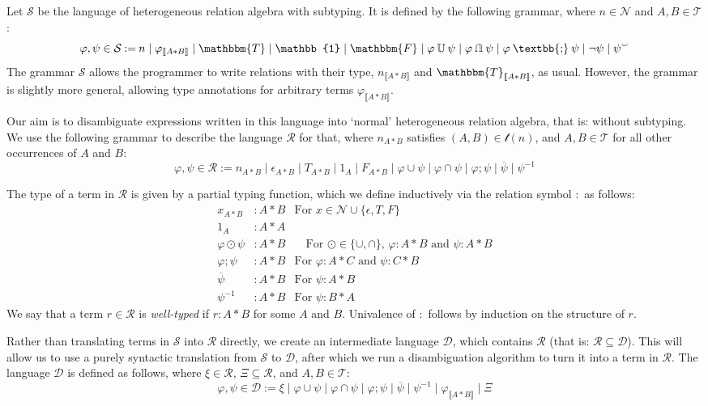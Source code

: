 \documentclass[12pt]{article}
\newcommand{\typesemi}{\mathbin{\text{\textbb{;}}}}
\newcommand{\typeunion}{\mathbin{\mathbb{U}}}
\newcommand{\typeinter}{\mathbin{\text{\rotatebox[origin=c]{180}{$\typeunion$}}}}
\newcommand{\typevee}{\mathbbm{T}}
\newcommand{\typenil}{\mathbbm{F}}
\newcommand{\typecomp}[1]{\neg{#1}}
\newcommand{\typeconv}[1]{{#1}^\smallsmile}
\newcommand{\typeident}{\mathbb{1}}
\newcommand{\typetyped}[2]{{#1}_{\llbracket #2 \rrbracket}}
\newcommand{\conv}[1]{{#1}^{-1}}
\begin{document}
Let $\mathcal{S}$ be the language of heterogeneous relation algebra with subtyping.
It is defined by the following grammar, where $n\in\mathcal{N}$ and $A,B\in\mathcal{T}$:
\[
\varphi,\psi\in\mathcal{S} \mathbin{:=} n \mid \typetyped{\varphi}{A*B} \mid \typevee \mid \typeident \mid \typenil \mid \varphi \typeunion \psi \mid \varphi \typeinter \psi \mid \varphi \typesemi \psi \mid \typecomp{\psi}\mid \typeconv{\psi}
\]
The grammar $\mathcal{S}$ allows the programmer to write relations with their type, $\typetyped{n}{A*B}$ and $\typetyped{\typevee}{A*B}$, as usual.
However, the grammar is slightly more general, allowing type annotations for arbitrary terms $\typetyped{\varphi}{A*B}$.

Our aim is to disambiguate expressions written in this language into `normal' heterogeneous relation algebra, that is: without subtyping.
We use the following grammar to describe the language $\mathcal{R}$ for that, where $n_{A*B}$ satisfies $(A,B)\in \mathcal{t}(n)$, and $A,B\in\mathcal{T}$ for all other occurrences of $A$ and $B$:
\[
\varphi,\psi\in\mathcal{R} \mathbin{:=} n_{A*B} \mid \epsilon_{A*B} \mid T_{A*B} \mid 1_{A} \mid F_{A*B} \mid \varphi \cup \psi \mid \varphi \cap \psi \mid \varphi ; \psi \mid \overline{\psi}\mid \conv{\psi}
\]

The type of a term in $\mathcal{R}$ is given by a partial typing function, which we define inductively via the relation symbol $:$ as follows:
\begin{align*}
x_{A*B} &: A * B & \text{For $x \in \mathcal{N} \cup \{\epsilon, T, F\}$}\\
1_{A} &: A * A&\\
\varphi \odot \psi &: A * B &\quad\text{For $\odot \in \{\cup,\cap\}$, $\varphi : A * B$ and $\psi : A * B$}\\
\varphi ; \psi &: A * B &\text{For $\varphi : A * C$ and $\psi : C * B$}\\
\overline{\psi} &: A * B &\text{For $\psi : A * B$}\\
\conv{\psi} &: A * B &\text{For $\psi : B * A$}
\end{align*}
We say that a term $r\in \mathcal{R}$ is \emph{well-typed} if $r : A*B$ for some $A$ and $B$.
Univalence of $:$ follows by induction on the structure of $r$.

Rather than translating terms in $\mathcal{S}$ into $\mathcal{R}$ directly, we create an intermediate language $\mathcal{D}$, which contains $\mathcal{R}$ (that is: $\mathcal{R} \subseteq \mathcal{D}$).
This will allow us to use a purely syntactic translation from $\mathcal{S}$ to $\mathcal{D}$, after which we run a disambiguation algorithm to turn it into a term in $\mathcal{R}$.
The language $\mathcal{D}$ is defined as follows, where $\xi \in \mathcal{R}$, $\Xi \subseteq \mathcal{R}$, and $A,B\in\mathcal{T}$:
\[
\varphi,\psi\in\mathcal{D} \mathbin{:=} \xi \mid \varphi \cup \psi \mid \varphi \cap \psi \mid \varphi ; \psi \mid \overline{\psi}\mid \conv{\psi} \mid \typetyped{\varphi}{A*B} \mid \Xi
\]
\end{document}
